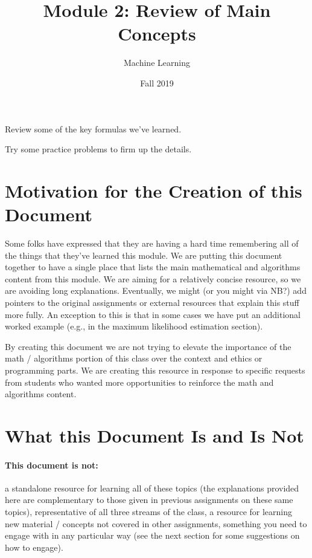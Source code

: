 \documentclass[review_Solutions]{subfiles}
\title{Module 2: Review of Main Concepts}
\author{Machine Learning}
\date{Fall 2019}
\begin{document}
\maketitle
\thispagestyle{firstpage}

\begin{learningobjectives}
\bi
\item Review some of the key formulas we've learned.
\item Try some practice problems to firm up the details.
\ei
\end{learningobjectives}

\section{Motivation for the Creation of this Document}

Some folks have expressed that they are having a hard time remembering all of the things that they've learned this module.  We are putting this document together to have a single place that lists the main mathematical and algorithms content from this module.  We are aiming for a relatively concise resource, so we are avoiding long explanations.  Eventually, we might (or you might via NB?) add pointers to the original assignments or external resources that explain this stuff more fully.  An exception to this is that in some cases we have put an additional worked example (e.g., in the maximum likelihood estimation section).

\vspace{1em}
\begin{notice}
By creating this document we are not trying to elevate the importance of the math / algorithms portion of this class over the context and ethics or programming parts.  We are creating this resource in response to specific requests from students who wanted more opportunities to reinforce the math and algorithms content.
\end{notice}

\section{What this Document Is and Is Not}

 \paragraph{\textbf{This document is not:}} a standalone resource for learning all of these topics (the explanations provided here are complementary to those given in previous assignments on these same topics), representative of all three streams of the class, a resource for learning new material / concepts not covered in other assignments, something you need to engage with in any particular way (see the next section for some suggestions on how to engage).
\end{document}
